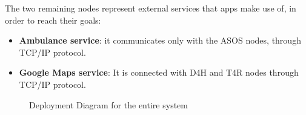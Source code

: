 The two remaining nodes represent external services that apps make use of, in order to reach their goals:
\begin{itemize}
    \item \textbf{Ambulance service}: it communicates only with the ASOS nodes, through TCP/IP protocol. 
    \item \textbf{Google Maps service}: It is connected with D4H and T4R nodes through TCP/IP protocol.
\end{itemize}

\begin{figure}[htbp]
    \centering
    \caption{Deployment Diagram for the entire system}
    \label{fig:Deployment}
\end{figure}